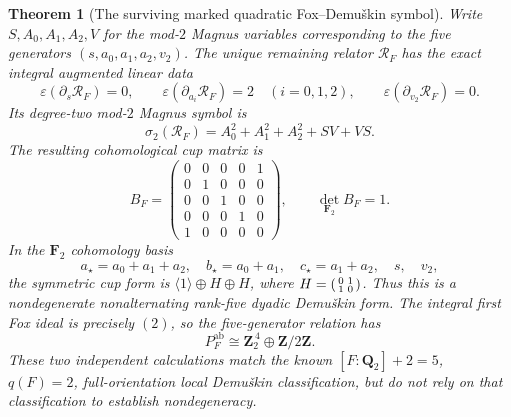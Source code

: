 \documentclass[11pt]{article}
\newtheorem{theorem}{Theorem}[section]
\theoremstyle{definition}
\begin{document}
\begin{theorem}[The surviving marked quadratic Fox--Demu\v{s}kin symbol]
\label{thm:dyadic-f133-explicit-five-cup-symbol}
Write $S,A_0,A_1,A_2,V$
for the mod-$2$
Magnus variables
corresponding to
the five generators
$(s,a_0,a_1,a_2,v_2)$.
The unique remaining
relator
$\mathscr R_F$
has the exact
integral augmented
linear data
\begin{equation}\label{eq:dyadic-f133-minimal-linear-fox}
\boxed{
\varepsilon(\partial_s\mathscr R_F)=0,\qquad
\varepsilon(\partial_{a_i}\mathscr R_F)=2
\quad(i=0,1,2),\qquad
\varepsilon(\partial_{v_2}\mathscr R_F)=0.
}
\end{equation}
Its degree-two
mod-$2$ Magnus
symbol is
\begin{equation}\label{eq:dyadic-f133-minimal-quadratic-fox}
\boxed{\qquad
\sigma_2(\mathscr R_F)
=A_0^2+A_1^2+A_2^2+SV+VS.
\qquad}
\end{equation}
The resulting
cohomological
cup matrix is
\begin{equation}\label{eq:dyadic-f133-cup-rank-five}
\boxed{
B_F=
\begin{pmatrix}
0&0&0&0&1\\
0&1&0&0&0\\
0&0&1&0&0\\
0&0&0&1&0\\
1&0&0&0&0
\end{pmatrix},
\qquad
\det_{\mathbf F_2}B_F=1.
}
\end{equation}
In the
$\mathbf F_2$
cohomology basis
\begin{equation}\label{eq:dyadic-f133-demushkin-cup-change}
\boxed{
a_\star=a_0+a_1+a_2,\quad
b_\star=a_0+a_1,\quad
c_\star=a_1+a_2,\quad
s,\quad v_2,
}
\end{equation}
the symmetric
cup form is
$\langle1\rangle
\oplus H\oplus H$,
where
$H=\begin{psmallmatrix}0&1\\1&0\end{psmallmatrix}$.
Thus this is
a nondegenerate
\emph{nonalternating}
rank-five dyadic
Demu\v{s}kin form.
The integral
first Fox ideal
is precisely $(2)$,
so the five-generator
relation has
\[
P_F^{\mathrm{ab}}
\cong\mathbf Z_2^{\,4}
\oplus\mathbf Z/2\mathbf Z.
\]
These two
independent
calculations
match the known
$[F:\mathbf Q_2]+2=5$,
$q(F)=2$,
full-orientation
local Demu\v{s}kin
classification, but
do \emph{not}
rely on that
classification
to establish
nondegeneracy.
\end{theorem}
\end{document}
